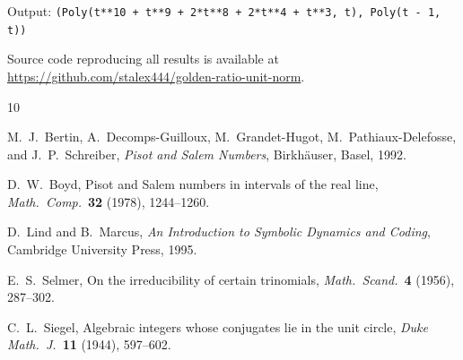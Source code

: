 \documentclass[12pt]{article}
\begin{document}
\noindent Output: \texttt{(Poly(t**10 + t**9 + 2*t**8 + 2*t**4 + t**3, t),
Poly(t - 1, t))}

\medskip
\noindent Source code reproducing all results is available at
\url{https://github.com/stalex444/golden-ratio-unit-norm}.


\begin{thebibliography}{10}

M.~J.~Bertin, A.~Decomps-Guilloux, M.~Grandet-Hugot,
M.~Pathiaux-Delefosse, and J.~P.~Schreiber,
\textit{Pisot and Salem Numbers}, Birkh\"auser, Basel, 1992.

D.~W.~Boyd, Pisot and Salem numbers in intervals of the real line,
\textit{Math.\ Comp.}\ \textbf{32} (1978), 1244--1260.

D.~Lind and B.~Marcus,
\textit{An Introduction to Symbolic Dynamics and Coding},
Cambridge University Press, 1995.

E.~S.~Selmer, On the irreducibility of certain trinomials,
\textit{Math.\ Scand.}\ \textbf{4} (1956), 287--302.

C.~L.~Siegel, Algebraic integers whose conjugates lie in the
unit circle, \textit{Duke Math.\ J.}\ \textbf{11} (1944), 597--602.

\end{thebibliography}
\end{document}
